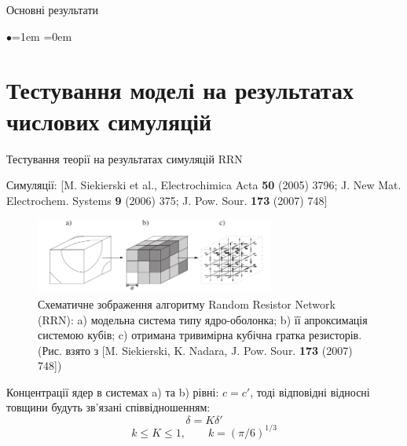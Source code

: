 \documentclass[10pt]{beamer}
\begin{document}
\begin{frame}{Основні результати}
\begin{list}{$\bullet$}{\leftmargin=1em \itemindent=0em}
\end{list}

\end{frame}


\section{Тестування моделі на результатах числових симуляцій}%

\begin{frame}{Тестування теорії на результатах симуляцій RRN}

{\footnotesize
Симуляції: [M. Siekierski et al., Electrochimica Acta {\bf 50} (2005) 3796; 
J. New Mat. Electrochem. Systems {\bf 9} (2006) 375;
J. Pow. Sour. {\bf 173} (2007) 748]
}

\begin{figure}[tb]
    \centering
    \includegraphics[width=0.7\textwidth]{images/RRN.png}
    \caption{Схематичне зображення алгоритму Random Resistor Network (RRN): a) модельна система типу ядро-оболонка; b) її апроксимація системою кубів; c) отримана тривимірна кубічна гратка резисторів.\\ {\footnotesize (Рис. взято з [M. Siekierski, K. Nadara, J. Pow. Sour. {\bf 173} (2007) 748])}}
\end{figure}
\vspace{-10pt}
Концентрації ядер в системах a) та b) рівні: $c=c'$, тоді відповідні відносні товщини будуть зв'язані співвідношенням:
$$
    \delta = K\delta'
$$
$$
    k \leq K \leq 1, \qquad k=(\pi/6)^{1/3}
$$

\end{frame}
\end{document}
